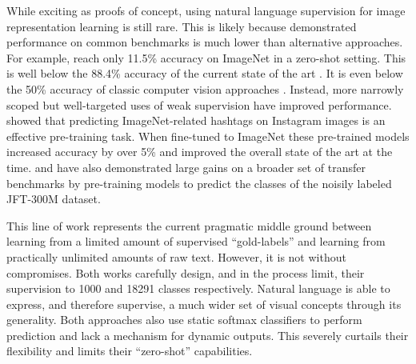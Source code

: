 While exciting as proofs of concept, using natural language supervision for image representation learning is still rare. This is likely because demonstrated performance on common benchmarks is much lower than alternative approaches. For example, \citet{li2017learning} reach only 11.5\% accuracy on ImageNet in a zero-shot setting. This is well below the 88.4\% accuracy of the current state of the art \citep{xie2020self}. It is even below the 50\% accuracy of classic computer vision approaches \citep{ILSVRC2012}. Instead, more narrowly scoped but well-targeted uses of weak supervision have improved performance. \citet{mahajan2018exploring} showed that predicting ImageNet-related hashtags on Instagram images is an effective pre-training task. When fine-tuned to ImageNet these pre-trained models increased accuracy by over 5\% and improved the overall state of the art at the time. \citet{kolesnikov2019large} and \citet{dosovitskiy2020image} have also demonstrated large gains on a broader set of transfer benchmarks by pre-training models to predict the classes of the noisily labeled JFT-300M dataset. 

This line of work represents the current pragmatic middle ground between learning from a limited amount of supervised ``gold-labels'' and learning from practically unlimited amounts of raw text. However, it is not without compromises. Both works carefully design, and in the process limit, their supervision to 1000 and 18291 classes respectively. Natural language is able to express, and therefore supervise, a much wider set of visual concepts through its generality. Both approaches also use static softmax classifiers to perform prediction and lack a mechanism for dynamic outputs. This severely curtails their flexibility and limits their ``zero-shot'' capabilities.

